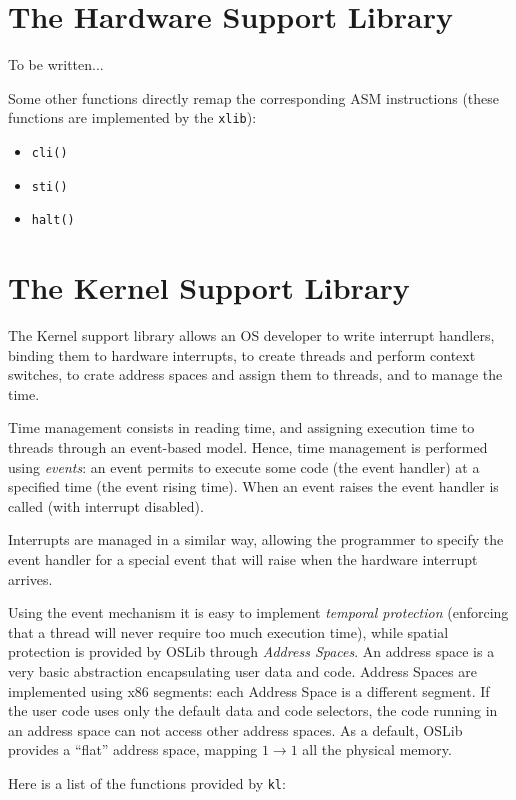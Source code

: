 \documentclass[a4paper]{report}
\begin{document}
\section{The Hardware Support Library}
To be written...

Some other functions directly remap the corresponding ASM
instructions (these functions are implemented by the {\tt xlib}):
\begin{itemize}
\item {\tt cli()}
\item {\tt sti()}
\item {\tt halt()}
\end{itemize}

\section{The Kernel Support Library}
The Kernel support library allows an OS developer to write interrupt
handlers, binding them to hardware interrupts, to create threads and
perform context switches, to crate address spaces and assign them to
threads, and to manage the time.

Time management consists in reading time, and assigning execution
time to threads through an event-based model. Hence, time management
is performed using {\em events}: an event permits to execute some code
(the event handler) at a specified time (the event rising time).
When an event raises the event handler is called (with interrupt disabled).

Interrupts are managed in a similar way, allowing the programmer to
specify the event handler for a special event that will raise when the
hardware interrupt arrives.

Using the event mechanism it is easy to implement {\em temporal protection}
(enforcing that a thread will never require too much execution time), while
spatial protection is provided by OSLib through {\em Address Spaces}. An
address space is a very basic abstraction encapsulating user data and code.
Address Spaces are implemented using x86 segments: each Address Space is a
different segment. If the user code uses only the default data and code
selectors, the code running in an address space can not access other address
spaces. As a default, OSLib provides a ``flat'' address space, mapping
$1 \rightarrow 1$ all the physical memory.

Here is a list of the functions provided by {\tt kl}:

\end{document}
